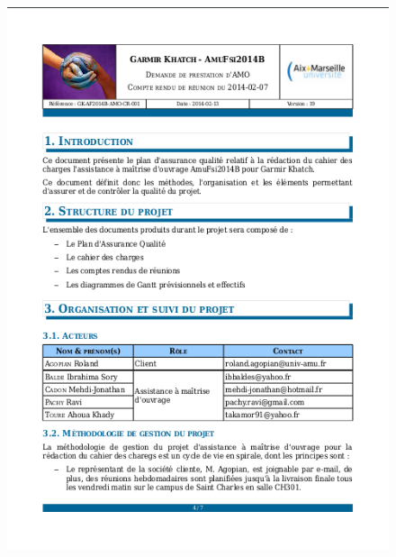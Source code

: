 \begin{frame}
\begin{figure}
\begin{minipage}[c]{.4\linewidth}
      \includegraphics[width=\textwidth]{Images/cg_corps_avant.png}
   \end{minipage}
\end{figure}

\end{frame} %

